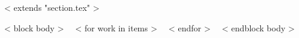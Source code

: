 ~< extends "section.tex" >~

~< block body >~
~< for work in items >~
~< endfor >~
~< endblock body >~

